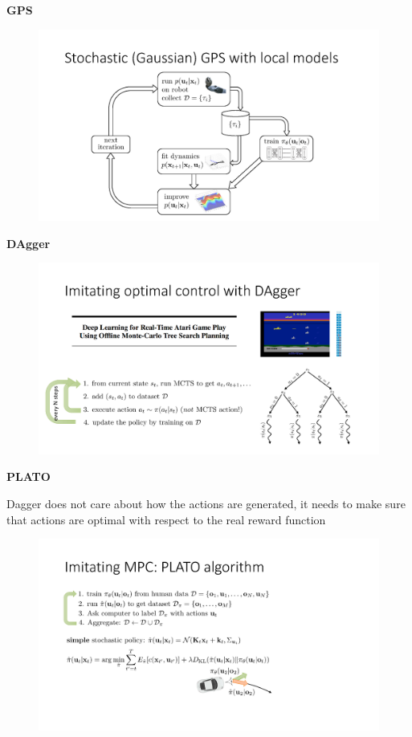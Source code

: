 \documentclass{article}
\begin{document}
\noindent\textbf{GPS} 

\begin{figure}[H]
    \centering
        \includegraphics[width=0.8\linewidth]{img/GPS.png}
\end{figure}

\noindent\textbf{DAgger} 
\begin{figure}[H]
    \centering
        \includegraphics[width=0.8\linewidth]{img/DAgger.png}
\end{figure}

\noindent\textbf{PLATO} 

Dagger does not  care about how the actions are generated, it needs to make sure that actions are optimal with respect to the real reward function

\begin{figure}[H]
    \centering
        \includegraphics[width=0.8\linewidth]{img/PLATO.png}
\end{figure}
\end{document}
